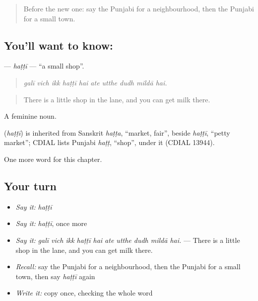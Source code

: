 \label{lesson:PA-C266-hatti}



\begin{quote}
Before the new one: say the Punjabi for a neighbourhood, then the Punjabi for a small town.
\end{quote}

\subsection*{You'll want to know: }
\textbf{} — \emph{haṭṭī} — \textquotedblleft{}a small shop\textquotedblright{}.

\begin{quote}
         
\end{quote}

\begin{quote}
\emph{galī vich ikk haṭṭī hai ate utthe dudh mildā hai.}
\end{quote}

\begin{quote}
There is a little shop in the lane, and you can get milk there.
\end{quote}

A feminine noun.

\begin{cousinweb}
\textbf{} (\emph{haṭṭī}) is inherited from Sanskrit \emph{haṭṭa}, \textquotedblleft{}market, fair\textquotedblright{}, beside \emph{haṭṭī}, \textquotedblleft{}petty market\textquotedblright{}; CDIAL lists Punjabi \emph{haṭṭ}, \textquotedblleft{}shop\textquotedblright{}, under it (CDIAL 13944).
\end{cousinweb}

\begin{grammarlens}[title={What you've built}]
One more word for this chapter.
\end{grammarlens}

\subsection*{Your turn}
\begin{itemize}
\raggedright
  \item \emph{Say it:} \emph{haṭṭī}
  \item \emph{Say it:} \emph{haṭṭī}, once more
  \item \emph{Say it:} \emph{galī vich ikk haṭṭī hai ate utthe dudh mildā hai.} — There is a little shop in the lane, and you can get milk there.
  \item \emph{Recall:} say the Punjabi for a neighbourhood, then the Punjabi for a small town, then say \emph{haṭṭī} again
  \item \emph{Write it:} copy \textbf{} once, checking the whole word
\end{itemize}

